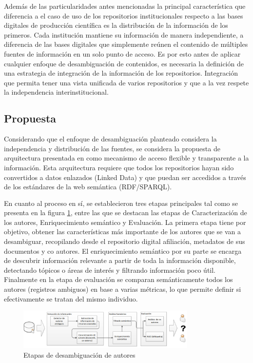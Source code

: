 \documentclass[conference]{IEEEtran}
\begin{document}
Además de las particularidades antes mencionadas la principal característica que diferencia a el caso de uso de los repositorios institucionales respecto a las bases digitales de producción científica  es la distribución de la información de los primeros. Cada institución mantiene su información de manera independiente, a diferencia de las bases digitales que simplemente reúnen el contenido de múltiples fuentes de información en un solo punto de acceso. Es por esto antes de aplicar cualquier enfoque de desambiguación de contenidos, es necesaria la definición de una estrategia de integración de la información de los repositorios. Integración que permita tener una vista unificada de varios repositorios y que a la vez respete la independencia interinstitucional. 

\subsection{Propuesta}
Considerando que el enfoque de desambiguación planteado  considera la independencia y distribución  de las fuentes, se considera la propuesta de arquitectura presentada en \cite{segarra2016integration} como mecanismo de acceso flexible y transparente a la información.  Esta arquitectura requiere que todos los repositorios hayan sido convertidos a datos enlazados (Linked Data) y que puedan ser accedidos a través de los estándares de la web semántica (RDF/SPARQL).

En cuanto al proceso en sí, se establecieron tres etapas principales tal como se presenta en la figura \ref{fig:etapas}, entre las que se destacan las etapas de  Caracterización de los autores, Enriquecimiento semántico y Evaluación. La primera etapa tiene por objetivo, obtener las características más importante de los autores que se van a desambiguar, recopilando desde el repositorio digital afiliación, metadatos de sus documentos y co autores. El enriquecimiento semántico por su parte se encarga de descubrir información relevante a partir de toda la información disponible, detectando tópicos o áreas de interés y filtrando información poco útil. Finalmente en la etapa de evaluación se comparan semánticamente todos los autores (registros ambiguos) en base a varias métricas, lo que permite definir si efectivamente se tratan del mismo individuo. 

\begin{figure}[!t]
\centering
\includegraphics[width=3.5in]{arquitectura}
\caption{Etapas de desambiguaci\'on de autores}
\label{fig:etapas}
\end{figure}
\end{document}
